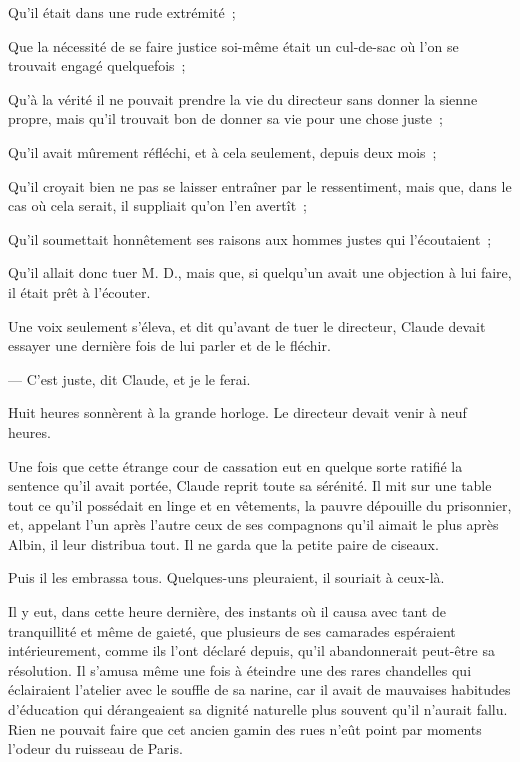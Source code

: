 \documentclass[french,twoside]{book} %
\begin{document}
Qu’il était dans une rude extrémité ;\par
Que la nécessité de se faire justice soi-même était un cul-de-sac où l’on se trouvait engagé quelquefois ;\par
Qu’à la vérité il ne pouvait prendre la vie du directeur sans donner la sienne propre, mais qu’il trouvait bon de donner sa vie pour une chose juste ;\par
Qu’il avait mûrement réfléchi, et à cela seulement, depuis deux mois ;\par
Qu’il croyait bien ne pas se laisser entraîner par le ressentiment, mais que, dans le cas où cela serait, il suppliait qu’on l’en avertît ;\par
 Qu’il soumettait honnêtement ses raisons aux hommes justes qui l’écoutaient ;\par
Qu’il allait donc tuer M. D., mais que, si quelqu’un avait une objection à lui faire, il était prêt à l’écouter.\par
Une voix seulement s’éleva, et dit qu’avant de tuer le directeur, Claude devait essayer une dernière fois de lui parler et de le fléchir.\par
— C’est juste, dit Claude, et je le ferai.\par
Huit heures sonnèrent à la grande horloge. Le directeur devait venir à neuf heures.\par
Une fois que cette étrange cour de cassation eut en quelque sorte ratifié la sentence qu’il avait portée, Claude reprit toute sa sérénité. Il mit sur une table tout ce qu’il possédait en linge et en vêtements, la pauvre dépouille du prisonnier, et, appelant l’un après l’autre ceux de ses compagnons qu’il aimait le plus après Albin, il leur distribua tout. Il ne garda que la petite paire de ciseaux.\par
Puis il les embrassa tous. Quelques-uns pleuraient, il souriait à ceux-là.\par
Il y eut, dans cette heure dernière, des instants où il causa avec tant de tranquillité et même de gaieté, que plusieurs de ses camarades espéraient intérieurement, comme ils l’ont déclaré depuis, qu’il abandonnerait peut-être sa résolution. Il s’amusa même une fois à éteindre une des rares chandelles qui éclairaient l’atelier avec le souffle de sa narine, car il avait de mauvaises habitudes d’éducation qui dérangeaient sa dignité naturelle plus souvent qu’il  n’aurait fallu. Rien ne pouvait faire que cet ancien gamin des rues n’eût point par moments l’odeur du ruisseau de Paris.\par
\end{document}
